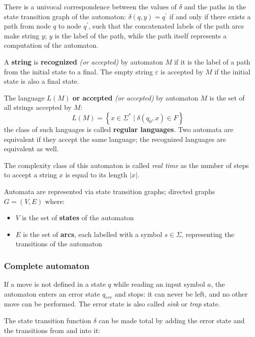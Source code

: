 \documentclass[english]{article}
\begin{document}
There is a univocal correspondence between the values of \(\delta\) and the paths in the state transition graph of the automaton: \(\delta(q, y) = q^\prime\) if and only if there exists a path from node \(q\) to node \(q^\prime\), such that the concatenated labels of the path arcs make string \(y\);
\(y\) is the label of the path, while the path itself represents a computation of the automaton.

A \textbf{string} is \textbf{recognized} \textit{(or accepted)} by automaton \(M\) if it is the label of a path from the initial state to a final.
The empty string \(\varepsilon\) is accepted by \(M\) if the initial state is also a final state.

The language \(L(M)\) \textbf{or accepted} \textit{(or accepted)} by automaton \(M\) is the set of all strings accepted by \(M\):
\[ L(M) = \left\{ x \in \Sigma^\ast \mid \delta(q_0, x) \in F \right\} \]
the class of such languages is called \textbf{regular languages}.
Two automata are equivalent if they accept the same language;
the recognized languages are equivalent as well.

The complexity class of this automaton is called \textit{real time} as the number of steps to accept a string \(x\) is equal to its length \(|x|\).

\bigskip
Automata are represented via state transition graphs; directed graphs \(G = (V, E)\) where:

\begin{itemize}
  \item \(V\) is the set of \textbf{states} of the automaton
  \item \(E\) is the set of \textbf{arcs}, each labelled with a symbol \(s \in \Sigma\), representing the transitions of the automaton
\end{itemize}

\subsubsection{Complete automaton}

If a move is not defined in a state \(q\) while reading an input symbol \(a\), the automaton enters an error state \(q_\textit{err}\) and stops: it can never be left, and no other move can be performed.
The error state is also called \textit{sink} or \textit{trap} state.

\bigskip
The state transition function \(\delta\) can be made total by adding the error state and the transitions from and into it:
\end{document}
